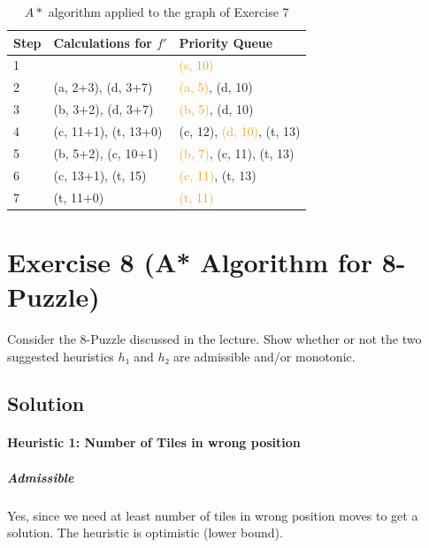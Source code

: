\documentclass[a4paper, 12pt]{report}
\newcommand{\highlight}[1]{\textcolor{orange}{#1}}
\begin{document}
\begin{table}[htbp]
    \caption{$A*$ algorithm applied to the graph of Exercise 7}
    \begin{center}
        \begin{tabular}{lll}
            Step & Calculations for $f'$    & Priority Queue\\
            \hline
            1    &                          & \highlight{(s, 10)}\\
            2    & (a, 2+3), (d, 3+7)       & \highlight{(a, 5)}, (d, 10)\\
            3    & (b, 3+2), (d, 3+7)       & \highlight{(b, 5)}, (d, 10)\\
            4    & (c, 11+1), (t, 13+0)     & (c, 12), \highlight{(d, 10)},
                                              (t, 13)\\
            5    & (b, 5+2), (c, 10+1)      & \highlight{(b, 7)}, (c, 11),
                                              (t, 13)\\
            6    & (c, 13+1), (t, 15)       & \highlight{(c, 11)}, (t, 13)\\
            7    & (t, 11+0)                & \highlight{(t, 11)}\\
        \end{tabular}
    \end{center}
    \label{table:A_Star}
\end{table}

\section{Exercise 8 (A* Algorithm for 8-Puzzle)}

Consider the 8-Puzzle discussed in the lecture. Show whether or not the two
suggested heuristics $h₁$ and $h₂$ are admissible and/or monotonic.

\subsection{Solution}

\paragraph{Heuristic 1: Number of Tiles in wrong position}

\subparagraph{Admissible}

Yes, since we need at least number of tiles in wrong position moves to get a
solution. The heuristic is optimistic (lower bound).
\end{document}
